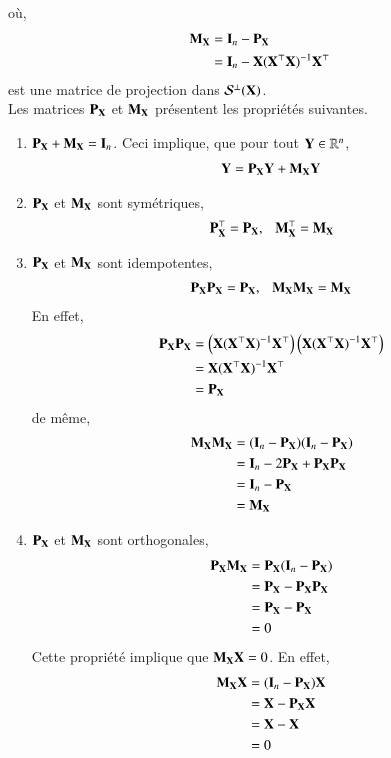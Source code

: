où,
\begin{align*}
\mathbf M_\mathbf X &= \mathbf{I}_n - \mathbf P_\mathbf X\\
& = \mathbf{I}_n - \mathbf X(\mathbf X^\top\mathbf X)^{-1}\mathbf X^\top
\end{align*}
est une matrice de projection dans $\mathcal{S}^\perp(\mathbf X)$.\\
Les matrices $\mathbf P_\mathbf X$ et $\mathbf M_\mathbf X$ présentent les propriétés suivantes.
\begin{enumerate}
\item $\mathbf P_\mathbf X+\mathbf M_\mathbf X = \mathbf{I}_n$. Ceci implique, que pour tout $\mathbf Y\in \mathbb{R}^n$,
\begin{align*}
\mathbf Y = \mathbf P_\mathbf X\mathbf Y+\mathbf M_\mathbf X\mathbf Y
\end{align*}
\item $\mathbf P_\mathbf X$ et $\mathbf M_\mathbf X$ sont symétriques,
\begin{align*}
\mathbf P_\mathbf X^\top = \mathbf P_\mathbf X, \ \ \ \mathbf M_\mathbf X^\top= \mathbf M_\mathbf X
\end{align*}
\item $\mathbf P_\mathbf X$ et $\mathbf M_\mathbf X$ sont idempotentes,
\begin{align*}
\mathbf P_\mathbf X\mathbf P_\mathbf X = \mathbf P_\mathbf X, \ \ \ \mathbf M_\mathbf X \mathbf M_\mathbf X= \mathbf M_\mathbf X
\end{align*}
En effet,
\begin{align*}
\mathbf P_\mathbf X\mathbf P_\mathbf X &= \left(\mathbf X(\mathbf X^\top\mathbf X)^{-1}\mathbf X^\top\right)\left(\mathbf X(\mathbf X^\top\mathbf X)^{-1}\mathbf X^\top\right)\\ 
&= \mathbf X(\mathbf X^\top\mathbf X)^{-1}\mathbf X^\top \\
&= \mathbf P_\mathbf X
\end{align*}
de même,
\begin{align*}
\mathbf M_\mathbf X\mathbf M_\mathbf X &= (\mathbf{I}_n - \mathbf P_\mathbf X)(\mathbf{I}_n - \mathbf P_\mathbf X)\\
& = \mathbf{I}_n - 2\mathbf P_\mathbf X + \mathbf P_\mathbf X\mathbf P_\mathbf X\\
&=\mathbf{I}_n - \mathbf P_\mathbf X\\
&=\mathbf M_\mathbf X
\end{align*}
\item $\mathbf P_\mathbf X$ et $\mathbf M_\mathbf X$ sont orthogonales,
\begin{align*}
\mathbf P_\mathbf X\mathbf M_\mathbf X &= \mathbf P_\mathbf X(\mathbf{I}_n -  \mathbf P_\mathbf X)\\
& =  \mathbf P_\mathbf X -  \mathbf P_\mathbf X \mathbf P_\mathbf X\\
&= \mathbf P_\mathbf X- \mathbf P_\mathbf X\\
&=0
\end{align*}
Cette propriété implique que $\mathbf M_\mathbf X\mathbf X = 0$. En effet,
\begin{align*}
\mathbf M_\mathbf X\mathbf X &= (\mathbf{I}_n - \mathbf P_\mathbf X)\mathbf X\\ 
&= \mathbf X-\mathbf P_\mathbf X\mathbf X\\
& = \mathbf X - \mathbf X\\
& = 0
\end{align*}
\end{enumerate}
